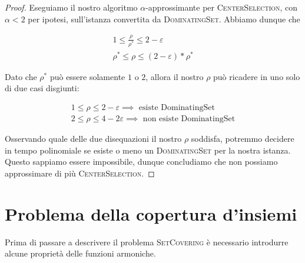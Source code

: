 \begin{proof}
	Eseguiamo il nostro algoritmo $\alpha$-approssimante per \textsc{CenterSelection}, con $\alpha < 2$ per ipotesi,
	sull'istanza convertita da \textsc{DominatingSet}. Abbiamo dunque che

	\begin{align*}
		1 \leq \frac{\rho}{\rho^*} \leq 2 - \varepsilon \\
		\rho^* \leq \rho \leq (2 - \varepsilon) * \rho^*
	\end{align*}

	Dato che $\rho^*$ può essere solamente $1$ o $2$, allora il nostro $\rho$ può ricadere in uno solo di due casi disgiunti:

	\begin{align*}
		1 \leq \rho \leq 2 - \varepsilon \implies \text{ esiste DominatingSet} \\
		2 \leq \rho \leq 4 - 2 \varepsilon \implies \text{ non esiste DominatingSet}
	\end{align*}

	Osservando quale delle due disequazioni il nostro $\rho$ soddisfa, potremmo decidere in tempo polinomiale
	se esiste o meno un \textsc{DominatingSet} per la nostra istanza. Questo sappiamo essere impossibile, dunque
	concludiamo che non possiamo approssimare di più \textsc{CenterSelection}.
\end{proof}


\section{Problema della copertura d'insiemi}
Prima di passare a descrivere il problema \textsc{SetCovering} è necessario
introdurre alcune proprietà delle funzioni armoniche.

